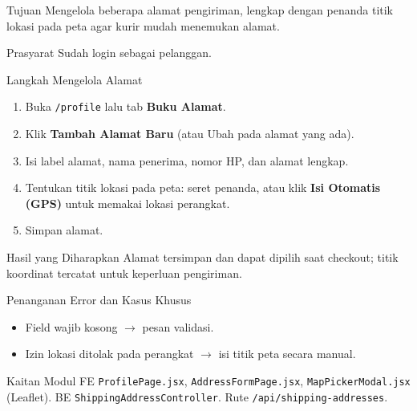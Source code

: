
\begin{flowsection}{Tujuan}
Mengelola beberapa alamat pengiriman, lengkap dengan penanda titik lokasi pada
peta agar kurir mudah menemukan alamat.
\end{flowsection}

\begin{flowsection}{Prasyarat}
Sudah login sebagai pelanggan.
\end{flowsection}

\begin{flowsection}{Langkah Mengelola Alamat}
\begin{enumerate}
  \item Buka \texttt{/profile} lalu tab \textbf{Buku Alamat}.
  \item Klik \textbf{Tambah Alamat Baru} (atau Ubah pada alamat yang ada).
  \item Isi label alamat, nama penerima, nomor HP, dan alamat lengkap.
  \item Tentukan titik lokasi pada peta: seret penanda, atau klik
        \textbf{Isi Otomatis (GPS)} untuk memakai lokasi perangkat.
  \item Simpan alamat.
\end{enumerate}
\end{flowsection}




\begin{flowsection}{Hasil yang Diharapkan}
Alamat tersimpan dan dapat dipilih saat checkout; titik koordinat tercatat untuk
keperluan pengiriman.
\end{flowsection}

\begin{flowsection}{Penanganan Error dan Kasus Khusus}
\begin{itemize}
  \item Field wajib kosong $\rightarrow$ pesan validasi.
  \item Izin lokasi ditolak pada perangkat $\rightarrow$ isi titik peta secara manual.
\end{itemize}
\end{flowsection}

\begin{flowsection}{Kaitan Modul}
FE \texttt{ProfilePage.jsx}, \texttt{AddressFormPage.jsx}, \texttt{MapPickerModal.jsx}
(Leaflet). BE \texttt{ShippingAddressController}. Rute \texttt{/api/shipping-addresses}.
\end{flowsection}

